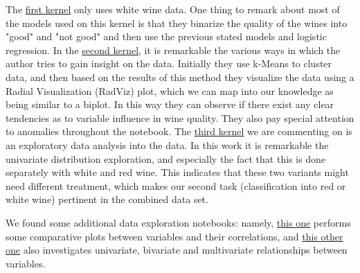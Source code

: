 \documentclass[10pt]{article}
\begin{document}
The \href{https://www.kaggle.com/indra90/predicting-white-wine-quality}{first kernel} only uses white wine data. One thing to remark about most of the models used on this kernel is that they binarize the quality of the wines into "good" and "not good" and then use the previous stated models and logistic regression.
In the \href{https://www.kaggle.com/conradws/how-good-is-this-wine-m-l-for-quality-control}{second kernel}, it is remarkable the various ways in which the author tries to gain insight on the data. Initially they use k-Means to cluster data, and then based on the results of this method they visualize the data using a Radial Visualization (RadViz) plot, which we can map into our knowledge as being similar to a biplot. In this way they can observe if there exist any clear tendencies as to variable influence in wine quality. They also pay special attention to anomalies throughout the notebook.
The \href{https://www.kaggle.com/danielpanizzo/red-and-white-wine-quality}{third kernel} we are commenting on is an exploratory data analysis into the data. In this work it is remarkable the univariate distribution exploration, and especially the fact that this is done separately with white and red wine. This indicates that these two variants might need different treatment, which makes our second task (classification into red or white wine) pertinent in the combined data set.

We found some additional data exploration notebooks: namely, \href{https://rstudio-pubs-static.s3.amazonaws.com/57835_c4ace81da9dc45438ad0c286bcbb4224.html}{this one} performs some comparative plots between variables and their correlations, and \href{http://rstudio-pubs-static.s3.amazonaws.com/219996_9cc8cf9f2e7e41fe8912454c3ad2685a.html}{this other one} also investigates univariate, bivariate and multivariate relationships between variables.
\end{document}

